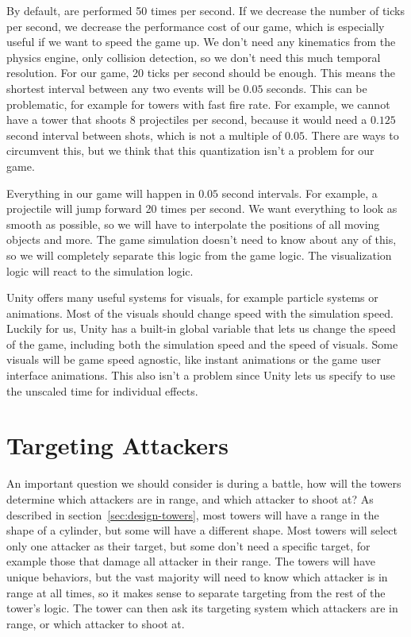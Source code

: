 By default,  are performed 50 times per second.
If we decrease the number of ticks per second, we decrease the performance cost of our game, which is especially useful if we want to speed the game up.
We don't need any kinematics from the physics engine, only collision detection, so we don't need this much temporal resolution.
For our game, 20 ticks per second should be enough.
This means the shortest interval between any two events will be $0.05$ seconds.
This can be problematic, for example for towers with fast fire rate.
For example, we cannot have a tower that shoots 8 projectiles per second, because it would need a $0.125$ second interval between shots, which is not a multiple of $0.05$.
There are ways to circumvent this, but we think that this quantization isn't a problem for our game.

Everything in our game will happen in $0.05$ second intervals.
For example, a projectile will jump forward 20 times per second.
We want everything to look as smooth as possible, so we will have to interpolate the positions of all moving objects and more.
The game simulation doesn't need to know about any of this, so we will completely separate this logic from the game logic.
The visualization logic will react to the simulation logic.

Unity offers many useful systems for visuals, for example particle systems or animations.
Most of the visuals should change speed with the simulation speed.
Luckily for us, Unity has a built-in global variable that lets us change the speed of the game, including both the simulation speed and the speed of visuals.
Some visuals will be game speed agnostic, like instant animations or the game user interface animations.
This also isn't a problem since Unity lets us specify to use the unscaled time for individual effects.

\section{Targeting Attackers}\label{sec:analysis-targeting}

An important question we should consider is during a battle, how will the towers determine which attackers are in range, and which attacker to shoot at?
As described in section~\ref{sec:design-towers}, most towers will have a range in the shape of a cylinder, but some will have a different shape.
Most towers will select only one attacker as their target, but some don't need a specific target, for example those that damage all attacker in their range.
The towers will have unique behaviors, but the vast majority will need to know which attacker is in range at all times, so it makes sense to separate targeting from the rest of the tower's logic.
The tower can then ask its targeting system which attackers are in range, or which attacker to shoot at.

